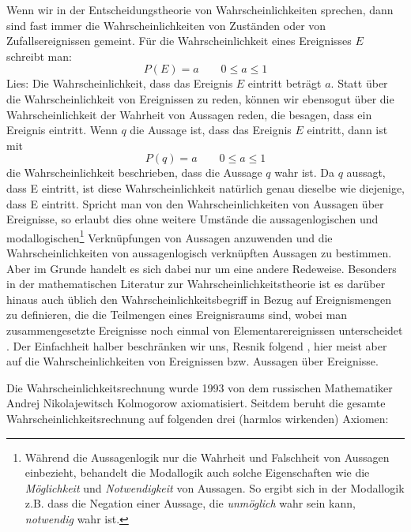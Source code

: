 Wenn wir in der Entscheidungstheorie von Wahrscheinlichkeiten
sprechen, dann sind fast immer die Wahrscheinlichkeiten von Zuständen oder von
Zufallsereignissen gemeint. Für die Wahrscheinlichkeit eines Ereignisses $E$
schreibt man:
\begin{displaymath}
P(E) = a \qquad 0 \leq a \leq 1
\end{displaymath}
Lies: Die Wahrscheinlichkeit, dass das Ereignis $E$ eintritt beträgt $a$. Statt
über die Wahrscheinlichkeit von Ereignissen zu reden, können wir ebensogut über die
Wahrscheinlichkeit der Wahrheit von Aussagen reden, die besagen, dass
ein Ereignis eintritt. Wenn $q$ die Aussage ist, dass das Ereignis $E$
eintritt, dann ist mit 
\begin{displaymath}
P(q) = a \qquad 0 \leq a \leq 1
\end{displaymath}
die Wahrscheinlichkeit beschrieben, dass die Aussage $q$ wahr ist. Da $q$
aussagt, dass E eintritt, ist diese Wahrscheinlichkeit natürlich genau dieselbe wie
diejenige, dass E eintritt. Spricht man von den Wahrscheinlichkeiten
von Aussagen über Ereignisse, so erlaubt dies ohne weitere Umstände
die aussagenlogischen und modallogischen\footnote{Während die Aussagenlogik nur
die Wahrheit und Falschheit von Aussagen einbezieht, behandelt die Modallogik
auch solche Eigenschaften wie die {\em Möglichkeit} und {\em Notwendigkeit} von
Aussagen. So ergibt sich in der Modallogik z.B. dass die Negation einer
Aussage, die {\em unmöglich} wahr sein kann, {\em notwendig} wahr ist.}
Verknüpfungen von Aussagen anzuwenden und die Wahrscheinlichkeiten von aussagenlogisch 
verknüpften Aussagen zu bestimmen. Aber im Grunde handelt es sich dabei nur 
um eine andere Redeweise. Besonders in der mathematischen Literatur zur 
Wahrscheinlichkeitstheorie ist es darüber hinaus auch üblich den 
Wahrscheinlichkeitsbegriff in Bezug auf Ereignismengen zu definieren, 
die die Teilmengen eines Ereignisraums sind, wobei man zusammengesetzte 
Ereignisse noch einmal von Elementarereignissen 
unterscheidet \cite[S. 1ff.]{bosch:1976}. Der
Einfachheit halber beschränken wir uns, Resnik folgend \cite[S.
45ff.]{resnik:1987}, hier meist aber auf die Wahrscheinlichkeiten von
Ereignissen bzw. Aussagen über Ereignisse.

Die Wahrscheinlichkeitsrechnung wurde 1993 von dem russischen Mathematiker
Andrej Nikolajewitsch Kolmogorow axiomatisiert. Seitdem beruht die gesamte
Wahrscheinlichkeitsrechnung auf folgenden drei (harmlos wirkenden) Axiomen:


